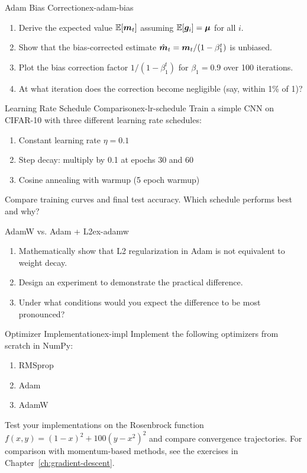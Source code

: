 \documentclass[../../main.tex]{subfiles}
\begin{document}
\begin{exercise}{Adam Bias Correction}{ex-adam-bias}
\begin{enumerate}[label=(\alph*)]
    \item Derive the expected value $\operatorname{\mathbb{E}}[\boldsymbol{m}_t]$ assuming $\operatorname{\mathbb{E}}[\boldsymbol{g}_i] = \boldsymbol{\mu}$ for all $i$.
    \item Show that the bias-corrected estimate $\hat{\boldsymbol{m}}_t = \boldsymbol{m}_t / (1 - \beta_1^t)$ is unbiased.
    \item Plot the bias correction factor $1/(1 - \beta_1^t)$ for $\beta_1 = 0.9$ over 100 iterations.
    \item At what iteration does the correction become negligible (say, within 1\% of 1)?
\end{enumerate}
\end{exercise}

\begin{exercise}{Learning Rate Schedule Comparison}{ex-lr-schedule}
Train a simple CNN on CIFAR-10 with three different learning rate schedules:
\begin{enumerate}[label=(\alph*)]
    \item Constant learning rate $\eta = 0.1$
    \item Step decay: multiply by 0.1 at epochs 30 and 60
    \item Cosine annealing with warmup (5 epoch warmup)
\end{enumerate}
Compare training curves and final test accuracy. Which schedule performs best and why?
\end{exercise}

\begin{exercise}{AdamW vs. Adam + L2}{ex-adamw}
\begin{enumerate}[label=(\alph*)]
    \item Mathematically show that L2 regularization in Adam is not equivalent to weight decay.
    \item Design an experiment to demonstrate the practical difference.
    \item Under what conditions would you expect the difference to be most pronounced?
\end{enumerate}
\end{exercise}

\begin{exercise}{Optimizer Implementation}{ex-impl}
Implement the following optimizers from scratch in NumPy:
\begin{enumerate}[label=(\alph*)]
    \item RMSprop
    \item Adam
    \item AdamW
\end{enumerate}
Test your implementations on the Rosenbrock function $f(x, y) = (1-x)^2 + 100(y-x^2)^2$ and compare convergence trajectories. For comparison with momentum-based methods, see the exercises in Chapter~\ref{ch:gradient-descent}.
\end{exercise}
\end{document}
